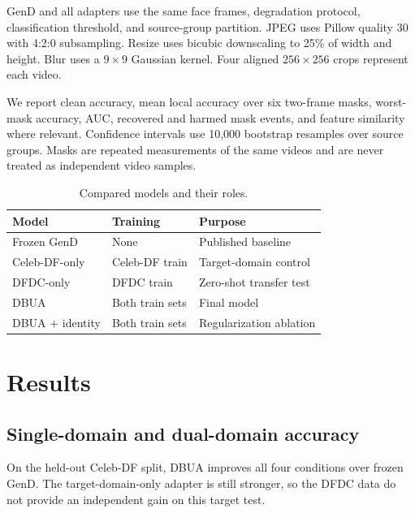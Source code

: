 \documentclass[10pt,twocolumn]{article}
\begin{document}
GenD and all adapters use the same face frames, degradation protocol,
classification threshold, and source-group partition. JPEG uses Pillow quality
30 with 4:2:0 subsampling. Resize uses bicubic downscaling to 25\% of width and
height. Blur uses a $9\times9$ Gaussian kernel. Four aligned $256\times256$
crops represent each video.

We report clean accuracy, mean local accuracy over six two-frame masks,
worst-mask accuracy, AUC, recovered and harmed mask events, and feature
similarity where relevant. Confidence intervals use 10,000 bootstrap resamples
over source groups. Masks are repeated measurements of the same videos and are
never treated as independent video samples.

\begin{table}[t]
  \centering
  \caption{Compared models and their roles.}
  \label{tab:models}
  \small
  \begin{tabular}{@{}p{}p{}p{}@{}}
    \toprule
    Model & Training & Purpose \\
    \midrule
    Frozen GenD & None & Published baseline \\
    Celeb-DF-only & Celeb-DF train & Target-domain control \\
    DFDC-only & DFDC train & Zero-shot transfer test \\
    DBUA & Both train sets & Final model \\
    DBUA + identity & Both train sets & Regularization ablation \\
    \bottomrule
  \end{tabular}
\end{table}

\section{Results}

\subsection{Single-domain and dual-domain accuracy}

On the held-out Celeb-DF split, DBUA improves all four conditions over frozen
GenD. The target-domain-only adapter is still stronger, so the DFDC data do not
provide an independent gain on this target test.
\end{document}
